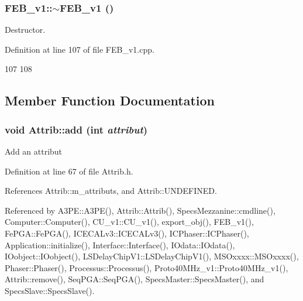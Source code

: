 \hypertarget{classFEB__v1_a655c6fb31068c4dbb7fde34de77a5a49}{
\subsubsection[{$\sim$FEB\_\-v1}]{\setlength{\rightskip}{0pt plus 5cm}FEB\_\-v1::$\sim$FEB\_\-v1 ()}}
\label{classFEB__v1_a655c6fb31068c4dbb7fde34de77a5a49}


Destructor. 

Definition at line 107 of file FEB\_\-v1.cpp.


\begin{DoxyCode}
107                 {
108 }
\end{DoxyCode}


\subsection{Member Function Documentation}
\hypertarget{classAttrib_a235f773af19c900264a190b00a3b4ad7}{
\subsubsection[{add}]{\setlength{\rightskip}{0pt plus 5cm}void Attrib::add (int {\em attribut})}}
\label{classAttrib_a235f773af19c900264a190b00a3b4ad7}
Add an attribut 

Definition at line 67 of file Attrib.h.

References Attrib::m\_\-attributs, and Attrib::UNDEFINED.

Referenced by A3PE::A3PE(), Attrib::Attrib(), SpecsMezzanine::cmdline(), Computer::Computer(), CU\_\-v1::CU\_\-v1(), export\_\-obj(), FEB\_\-v1(), FePGA::FePGA(), ICECALv3::ICECALv3(), ICPhaser::ICPhaser(), Application::initialize(), Interface::Interface(), IOdata::IOdata(), IOobject::IOobject(), LSDelayChipV1::LSDelayChipV1(), MSOxxxx::MSOxxxx(), Phaser::Phaser(), Processus::Processus(), Proto40MHz\_\-v1::Proto40MHz\_\-v1(), Attrib::remove(), SeqPGA::SeqPGA(), SpecsMaster::SpecsMaster(), and SpecsSlave::SpecsSlave().


